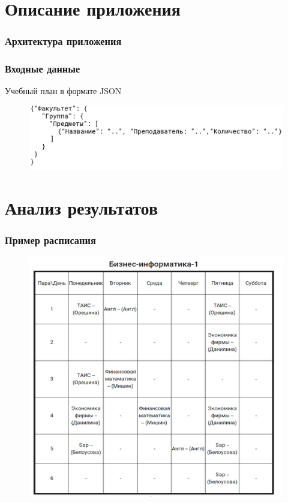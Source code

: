 \documentclass[t, 12pt]{beamer}
\theoremstyle{definition}
\begin{document}
\section{Описание приложения}

\begin{frame}
\frametitle{Архитектура приложения}
\begin{figure}
    \scriptsize
    \centering
    
\end{figure}
\end{frame}

\begin{frame}
\frametitle{Входные данные}
Учебный план в формате JSON
\begin{figure}
    \centering
    \includegraphics[height=0.25\linewidth]{images/input_format.png}
\end{figure}
\end{frame}

\section{Анализ результатов}

\begin{frame}
\frametitle{Пример расписания}
\begin{figure}
\centering
\includegraphics[scale=0.35]{images/timetable.png}    
\end{figure}
\end{frame}
\end{document}
